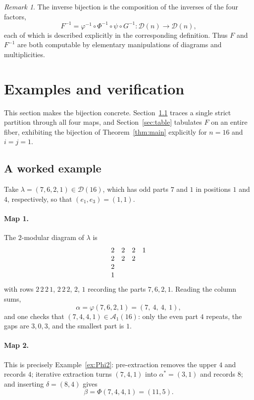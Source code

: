 \documentclass[11pt]{amsart}
\theoremstyle{definition}
\theoremstyle{remark}
\newtheorem{remark}[theorem]{Remark}
\newcommand{\D}{\mathcal D}
\newcommand{\Aone}{\mathcal A_1}
\begin{document}
\begin{remark}
The inverse bijection is the composition of the inverses of the four factors,
\[
   F^{-1}=\varphi^{-1}\circ\Phi^{-1}\circ\psi\circ G^{-1}
   :\D(n)\longrightarrow\D(n),
\]
each of which is described explicitly in the corresponding definition. Thus $F$ and $F^{-1}$ are both computable by elementary manipulations of diagrams and multiplicities.
\end{remark}

\section{Examples and verification}\label{sec:numerics}

This section makes the bijection concrete. Section~\ref{sec:example} traces a single strict partition through all four maps, and Section~\ref{sec:table} tabulates $F$ on an entire fiber, exhibiting the bijection of Theorem~\ref{thm:main} explicitly for $n=16$ and $i=j=1$.

\subsection{A worked example}\label{sec:example}
Take \(\lambda=(7,6,2,1)\in\D(16)\), which has odd parts $7$ and $1$ in positions $1$ and $4$, respectively, so that $(e_1,e_3)=(1,1)$.
\paragraph{Map 1.}
The \(2\)-modular diagram of $\lambda$ is
\[
\begin{array}{@{}cccc@{}}
2 & 2 & 2 & 1\\
2 & 2 & 2 & \\
2 & & & \\
1 & & &
\end{array}
\]
with rows $2\,2\,2\,1$, $2\,2\,2$, $2$, $1$ recording the parts $7,6,2,1$. Reading the column sums,
\[
   \alpha=\varphi(7,6,2,1)=(7,\ 4,\ 4,\ 1),
\]
and one checks that $(7,4,4,1)\in\Aone(16)$: only the even part $4$ repeats, the gaps are $3,0,3$, and the smallest part is $1$.

\paragraph{Map 2.}
This is precisely Example~\ref{ex:Phi2}: pre-extraction removes the upper $4$ and records $4$; iterative extraction turns $(7,4,1)$ into $\alpha^\ast=(3,1)$ and records $8$; and inserting $\delta=(8,4)$ gives
\[
   \beta=\Phi(7,4,4,1)=(11,5).
\]
\end{document}

